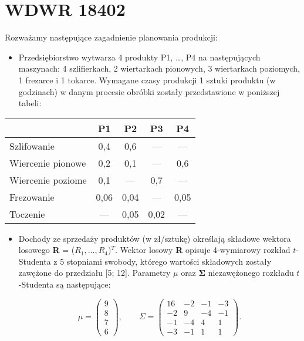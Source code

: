 \documentclass[12pt]{article}
\begin{document}
\section*{WDWR 18402}

Rozważamy następujące zagadnienie planowania produkcji:

\begin{itemize}
\item Przedsiębiorstwo wytwarza 4 produkty P1, \ldots, P4 na następujących maszynach: 4 szlifierkach, 2 wiertarkach pionowych, 3 wiertarkach poziomych, 1 frezarce i 1 tokarce. Wymagane czasy produkcji 1 sztuki produktu (w godzinach) w danym procesie obróbki zostały przedstawione w poniższej tabeli:
\end{itemize}

\begin{table}[h!]
\centering
\begin{tabular}{|l|c|c|c|c|}
\hline
                   & P1   & P2   & P3   & P4   \\
\hline
Szlifowanie       & 0,4  & 0,6  & —    & —    \\
\hline
Wiercenie pionowe & 0,2  & 0,1  & —    & 0,6  \\
\hline
Wiercenie poziome & 0,1  & —    & 0,7  & —    \\
\hline
Frezowanie        & 0,06 & 0,04 & —    & 0,05 \\
\hline
Toczenie          & —    & 0,05 & 0,02 & —    \\
\hline
\end{tabular}
\end{table}

\begin{itemize}
\item Dochody ze sprzedaży produktów (w zł/sztukę) określają składowe wektora losowego \textbf{R} = ($R_1, \ldots, R_4$)$^T$. Wektor losowy \textbf{R} opisuje 4-wymiarowy rozkład $t$-Studenta z 5 stopniami swobody, którego wartości składowych zostały zawężone do przedziału [5; 12]. Parametry $\mu$ oraz $\mathbf{\Sigma}$ niezawężonego rozkładu $t$-Studenta są następujące:

$$
\mu = \begin{pmatrix} 9 \\ 8 \\ 7 \\ 6 \end{pmatrix}, \qquad \Sigma = \begin{pmatrix} 16 & -2 & -1 & -3 \\ -2 & 9 & -4 & -1 \\ -1 & -4 & 4 & 1 \\ -3 & -1 & 1 & 1 \end{pmatrix}.
$$
\end{itemize}
\end{document}
